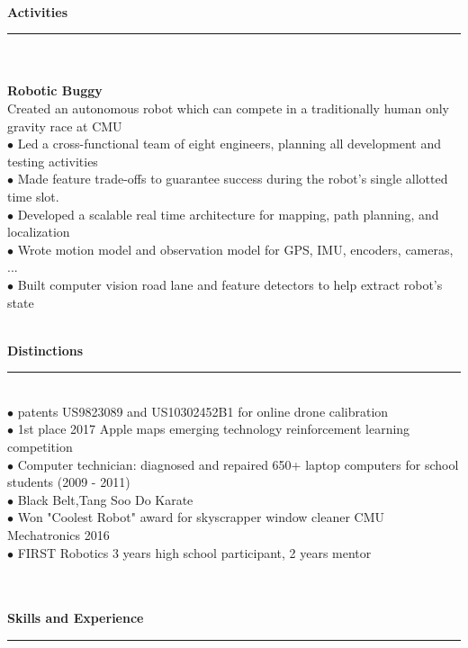 \documentclass[12pt]{article}
\newcommand{\point}[1]{\\[-.5em] \textbf{\fontsize{14pt}{13pt}\selectfont #1} \\[0em]}
\newcommand{\subpoint}[1]{\-\hspace{.2cm}  $\bullet$ \-\hspace{.05cm} #1\\[0em]}
\newcommand{\Date}[1]{ \text{\fontsize{12pt}{12pt}\selectfont #1}}
\newcommand{\Heading}[1]{\\{\large \textbf{#1}\\[-.5em]  \rule{20cm}{.1cm} \- \vspace{-.25cm}}}
\begin{document}
%
\-\
\Work
%
\vspace*{-.2cm}
\Education
%
%
%
\-\
 \Heading{Activities}\\
 \vspace*{-0.5cm}
\point{Robotic Buggy \hfill \Date{2013 - 2016\hspace{.35cm}}} 
Created an autonomous robot which can compete in a traditionally human only gravity race at CMU\\
\subpoint{Led a cross-functional team of eight engineers, planning all development and testing activities}
\subpoint{Made feature trade-offs to guarantee success during the robot’s single allotted time slot.}
\subpoint{Developed a scalable real time architecture for mapping, path planning, and localization}
\subpoint{Wrote motion model and observation model for GPS, IMU, encoders, cameras, ...}
\subpoint{Built computer vision road lane and feature detectors to help extract robot's state}
%
%
\vspace*{0cm} 
%
%
%
%
%
%
%
%
%
\vspace*{0cm}
  \Heading{Distinctions}  \\[.6em]
  \subpoint{patents US9823089 and US10302452B1 for online drone calibration}
  \subpoint{1st place 2017 Apple maps emerging technology reinforcement learning competition}
\subpoint{Computer technician: diagnosed and repaired 650+ laptop computers for school students (2009 - 2011)}
\subpoint{Black Belt,Tang Soo Do Karate}
 \subpoint{Won "Coolest Robot" award for  skyscrapper window cleaner CMU Mechatronics 2016}	
 \subpoint{FIRST Robotics 3 years high school participant, 2 years mentor}
%
%
%
%
\\
\vspace*{-.6cm}
\Heading{Skills and Experience}  \\[.6em] 
\end{document}
